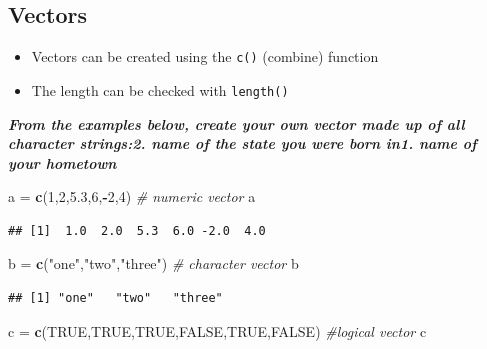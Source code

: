 \documentclass[
]{article}
\newenvironment{Shaded}{\begin{snugshade}}{\end{snugshade}}
\newcommand{\CommentTok}[1]{\textcolor[rgb]{0.56,0.35,0.01}{\textit{#1}}}
\newcommand{\DecValTok}[1]{\textcolor[rgb]{0.00,0.00,0.81}{#1}}
\newcommand{\FloatTok}[1]{\textcolor[rgb]{0.00,0.00,0.81}{#1}}
\newcommand{\KeywordTok}[1]{\textcolor[rgb]{0.13,0.29,0.53}{\textbf{#1}}}
\newcommand{\NormalTok}[1]{#1}
\newcommand{\OperatorTok}[1]{\textcolor[rgb]{0.81,0.36,0.00}{\textbf{#1}}}
\newcommand{\OtherTok}[1]{\textcolor[rgb]{0.56,0.35,0.01}{#1}}
\newcommand{\StringTok}[1]{\textcolor[rgb]{0.31,0.60,0.02}{#1}}
\providecommand{\tightlist}{%
  \setlength{\itemsep}{0pt}\setlength{\parskip}{0pt}}
\begin{document}
\hypertarget{vectors}{%
\subsection{\texorpdfstring{\textbf{Vectors}}{Vectors}}\label{vectors}}

\begin{itemize}
\tightlist
\item
  Vectors can be created using the \texttt{c()} (combine) function
\item
  The length can be checked with \texttt{length()}
\end{itemize}

\textbf{\emph{From the examples below, create your own vector made up of
all character strings:2. name of the state you were born in1. name of
your hometown}}

\begin{Shaded}
\begin{Highlighting}[]
\NormalTok{a =}\StringTok{ }\KeywordTok{c}\NormalTok{(}\DecValTok{1}\NormalTok{,}\DecValTok{2}\NormalTok{,}\FloatTok{5.3}\NormalTok{,}\DecValTok{6}\NormalTok{,}\OperatorTok{-}\DecValTok{2}\NormalTok{,}\DecValTok{4}\NormalTok{) }\CommentTok{# numeric vector}
\NormalTok{a}
\end{Highlighting}
\end{Shaded}

\begin{verbatim}
## [1]  1.0  2.0  5.3  6.0 -2.0  4.0
\end{verbatim}

\begin{Shaded}
\begin{Highlighting}[]
\NormalTok{b =}\StringTok{ }\KeywordTok{c}\NormalTok{(}\StringTok{"one"}\NormalTok{,}\StringTok{"two"}\NormalTok{,}\StringTok{"three"}\NormalTok{) }\CommentTok{# character vector}
\NormalTok{b}
\end{Highlighting}
\end{Shaded}

\begin{verbatim}
## [1] "one"   "two"   "three"
\end{verbatim}

\begin{Shaded}
\begin{Highlighting}[]
\NormalTok{c =}\StringTok{ }\KeywordTok{c}\NormalTok{(}\OtherTok{TRUE}\NormalTok{,}\OtherTok{TRUE}\NormalTok{,}\OtherTok{TRUE}\NormalTok{,}\OtherTok{FALSE}\NormalTok{,}\OtherTok{TRUE}\NormalTok{,}\OtherTok{FALSE}\NormalTok{) }\CommentTok{#logical vector}
\NormalTok{c}
\end{Highlighting}
\end{Shaded}
\end{document}
